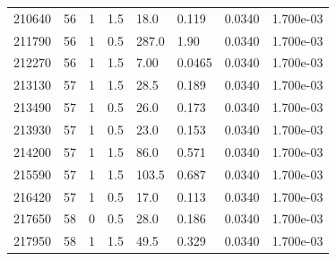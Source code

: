 \documentclass[preview]{standalone}
\begin{document}
{{{{{{{\begin{tabular}{L{1.2cm}C{1.2cm} C{0.3cm}C{0.5cm} C{1.4cm}C{1.4cm} C{1.4cm}C{1.4cm}}
  210640  &    56  & 1     & 1.5 &  18.0  & 0.119  & 0.0340 &  1.700e-03   \\ 
  211790  &    56  & 1     & 0.5 &  287.0  & 1.90  & 0.0340 &  1.700e-03   \\ 
  212270  &    56  & 1     & 1.5 &  7.00  & 0.0465  & 0.0340 &  1.700e-03   \\ 
  213130  &    57  & 1     & 1.5 &  28.5  & 0.189  & 0.0340 &  1.700e-03   \\ 
  213490  &    57  & 1     & 0.5 &  26.0  & 0.173  & 0.0340 &  1.700e-03   \\ 
  213930  &    57  & 1     & 0.5 &  23.0  & 0.153  & 0.0340 &  1.700e-03   \\ 
  214200  &    57  & 1     & 1.5 &  86.0  & 0.571  & 0.0340 &  1.700e-03   \\ 
  215590  &    57  & 1     & 1.5 &  103.5  & 0.687  & 0.0340 &  1.700e-03   \\ 
  216420  &    57  & 1     & 0.5 &  17.0  & 0.113  & 0.0340 &  1.700e-03   \\ 
  217650  &    58  & 0     & 0.5 &  28.0  & 0.186  & 0.0340 &  1.700e-03   \\ 
  217950  &    58  & 1     & 1.5 &  49.5  & 0.329  & 0.0340 &  1.700e-03   \\ 
\hline 
\end{tabular} 

}}}}}}}
\end{document}
